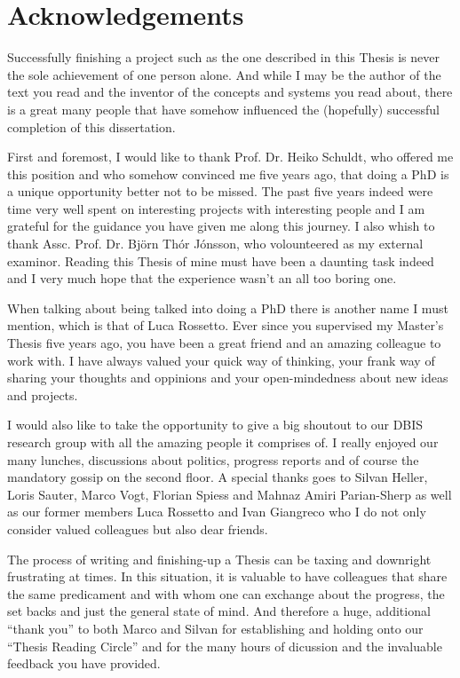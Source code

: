 
\chapter{Acknowledgements}

Successfully finishing a project such as the one described in this Thesis is never the sole achievement of one person alone. And while I may be the author of the text you read and the inventor of the concepts and systems you read about, there is a great many people that have somehow influenced the (hopefully) successful completion of this dissertation.

First and foremost, I would like to thank Prof. Dr. Heiko Schuldt, who offered me this position and who somehow convinced me five years ago, that doing a PhD is a unique opportunity better not to be missed. The past five years indeed were time very well spent on interesting projects with interesting people and I am grateful for the guidance you have given me along this journey. I also whish to thank Assc. Prof. Dr. Björn Thór Jónsson, who volounteered as my external examinor. Reading this Thesis of mine must have been a daunting task indeed and I very much hope that the experience wasn't an all too boring one.

When talking about being talked into doing a PhD there is another name I must mention, which is that of Luca Rossetto. Ever since you supervised my Master's Thesis five years ago, you have been a great friend and an amazing colleague to work with. I have always valued your quick way of thinking, your frank way of sharing your thoughts and oppinions and your open-mindedness about new ideas and projects.

I would also like to take the opportunity to give a big shoutout to our DBIS research group with all the amazing people it comprises of. I really enjoyed our many lunches, discussions about politics, progress reports and of course the mandatory gossip on the second floor. A special thanks goes to Silvan Heller, Loris Sauter, Marco Vogt, Florian Spiess and Mahnaz Amiri Parian-Sherp as well as our former members Luca Rossetto and Ivan Giangreco who I do not only consider valued colleagues but also dear friends.

The process of writing and finishing-up a Thesis can be taxing and downright frustrating at times. In this situation, it is valuable to have colleagues that share the same predicament and with whom one can exchange about the progress, the set backs and just the general state of mind. And therefore a huge, additional ``thank you'' to both Marco and Silvan for establishing and holding onto our ``Thesis Reading Circle'' and for the many hours of dicussion and the invaluable feedback you have provided.

